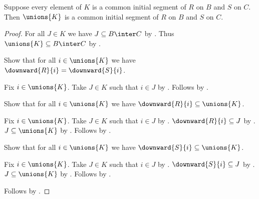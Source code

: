 \begin{lemma}\label{union_common_initial_segments}
    Suppose every element of $K$ is a common initial segment of $R$ on $B$ and $S$ on $C$.
    Then $\unions{K}$ is a common initial segment of $R$ on $B$ and $S$ on $C$.
\end{lemma}
\begin{proof}
    For all $J\in K$ we have $J\subseteq B\inter C$ by .
    Thus $\unions{K}\subseteq B\inter C$ by .

    Show that for all $i\in\unions{K}$ we have $\downward{R}{i}=\downward{S}{i}$.
    \begin{subproof}
        Fix $i\in\unions{K}$.
        Take $J\in K$ such that $i\in J$ by .
        Follows by .
    \end{subproof}

    Show that for all $i\in\unions{K}$ we have $\downward{R}{i}\subseteq\unions{K}$.
    \begin{subproof}
        Fix $i\in\unions{K}$.
        Take $J\in K$ such that $i\in J$ by .
        $\downward{R}{i}\subseteq J$ by .
        $J\subseteq\unions{K}$ by .
        Follows by .
    \end{subproof}

    Show that for all $i\in\unions{K}$ we have $\downward{S}{i}\subseteq\unions{K}$.
    \begin{subproof}
        Fix $i\in\unions{K}$.
        Take $J\in K$ such that $i\in J$ by .
        $\downward{S}{i}\subseteq J$ by .
        $J\subseteq\unions{K}$ by .
        Follows by .
    \end{subproof}

    Follows by .
\end{proof}


